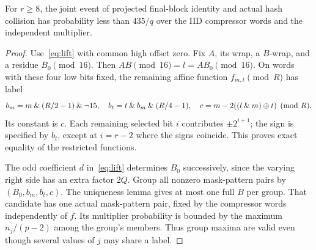 \begin{lemma}\label{lem:435}
For $r\ge8$, the joint event of projected final-block identity and actual hash collision has probability less than $435/q$ over the IID compressor words and the independent multiplier.
\end{lemma}
\begin{proof}
Use~\eqref{eq:lift} with common high offset zero. Fix $A$, its wrap, a $B$-wrap, and a residue $B_0\pmod{16}$. Then $AB\pmod{16}=l=AB_0\pmod{16}$. On words with these four low bits fixed, the remaining affine function $f_{m,t}\pmod R$ has label
\begin{equation}\label{eq:restricted}
 b_m=m\mathbin{\&}(R/2-1)\mathbin{\&}\neg15,\quad
 b_t=t\mathbin{\&} b_m\mathbin{\&}(R/4-1),\quad
 c=m-2((l\mathbin{\&} m)\mathbin\oplus t)\pmod R.
\end{equation}
Its constant is $c$. Each remaining selected bit $i$ contributes $\pm2^{i+1}$; the sign is specified by $b_t$, except at $i=r-2$ where the signs coincide. This proves exact equality of the restricted functions.

The odd coefficient $d$ in~\eqref{eq:lift} determines $B_0$ successively, since the varying right side has an extra factor $2Q$. Group all nonzero mask-pattern pairs by $(B_0,b_m,b_t,c)$. The uniqueness lemma gives at most one full $B$ per group. That candidate has one actual mask-pattern pair, fixed by the compressor words independently of $f$. Its multiplier probability is bounded by the maximum $n_j/(p-2)$ among the group's members. Thus group maxima are valid even though several values of $j$ may share a label.


\end{proof}
